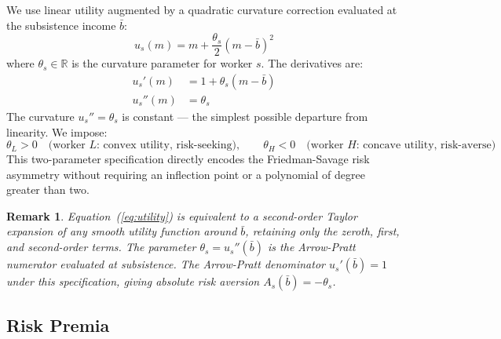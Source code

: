 \documentclass[12pt,a4paper]{article}
\newtheorem{remark}{Remark}
\begin{document}
We use linear utility augmented by a quadratic curvature correction
evaluated at the subsistence income $\bar{b}$:
\begin{equation}
  u_s(m) = m + \frac{\theta_s}{2}(m - \bar{b})^2
  \label{eq:utility}
\end{equation}
where $\theta_s \in \mathbb{R}$ is the curvature parameter for worker
$s$. The derivatives are:
\begin{align}
  u_s'(m) &= 1 + \theta_s(m - \bar{b}) \label{eq:uprime} \\
  u_s''(m) &= \theta_s \label{eq:upprime}
\end{align}
The curvature $u_s'' = \theta_s$ is constant --- the simplest possible
departure from linearity. We impose:
\begin{equation}
  \theta_L > 0 \quad \text{(worker $L$: convex utility, risk-seeking)},
  \qquad
  \theta_H < 0 \quad \text{(worker $H$: concave utility, risk-averse)}
  \label{eq:theta_signs}
\end{equation}
This two-parameter specification directly encodes the Friedman-Savage
risk asymmetry without requiring an inflection point or a polynomial
of degree greater than two.

\begin{remark}
Equation~(\ref{eq:utility}) is equivalent to a second-order Taylor
expansion of any smooth utility function around $\bar{b}$, retaining
only the zeroth, first, and second-order terms. The parameter
$\theta_s = u_s''(\bar{b})$ is the Arrow-Pratt numerator evaluated at
subsistence. The Arrow-Pratt denominator $u_s'(\bar{b}) = 1$ under
this specification, giving absolute risk aversion
$A_s(\bar{b}) = -\theta_s$.
\end{remark}

\subsection{Risk Premia}
\end{document}
